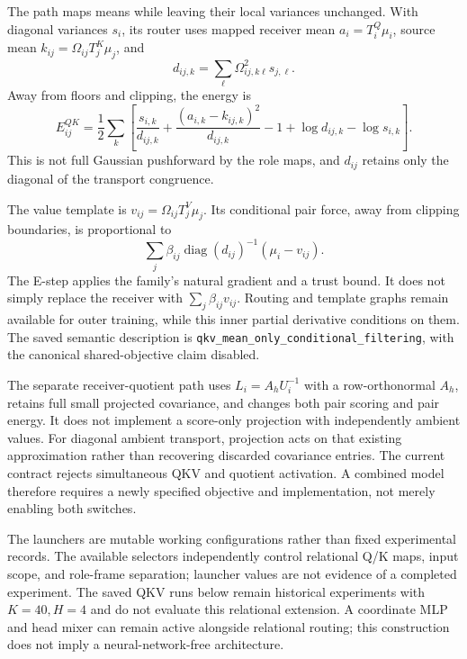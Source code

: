 \documentclass[11pt,letterpaper]{article}
\newcommand{\diag}{\operatorname{diag}}
\theoremstyle{remark}
\begin{document}
The path maps means while leaving their local variances unchanged. With diagonal variances $s_i$, its router uses mapped receiver mean $a_i=T_i^Q\mu_i$, source mean $k_{ij}=\Omega_{ij}T_j^K\mu_j$, and
\begin{equation}
 d_{ij,k}=\sum_\ell\Omega_{ij,k\ell}^2s_{j,\ell}.
\end{equation}
Away from floors and clipping, the energy is
\begin{equation}
 E_{ij}^{QK}=\frac12\sum_k\left[
 \frac{s_{i,k}}{d_{ij,k}}
 +\frac{(a_{i,k}-k_{ij,k})^2}{d_{ij,k}}
 -1+\log d_{ij,k}-\log s_{i,k}\right].
\end{equation}
This is not full Gaussian pushforward by the role maps, and $d_{ij}$ retains only the diagonal of the transport congruence.

The value template is $v_{ij}=\Omega_{ij}T_j^V\mu_j$. Its conditional pair force, away from clipping boundaries, is proportional to
\begin{equation}
 \sum_j\beta_{ij}\diag(d_{ij})^{-1}(\mu_i-v_{ij}).
\end{equation}
The E-step applies the family's natural gradient and a trust bound. It does not simply replace the receiver with $\sum_j\beta_{ij}v_{ij}$. Routing and template graphs remain available for outer training, while this inner partial derivative conditions on them. The saved semantic description is \texttt{qkv\_mean\_only\_conditional\_filtering}, with the canonical shared-objective claim disabled.

The separate receiver-quotient path uses $L_i=A_hU_i^{-1}$ with a row-orthonormal $A_h$, retains full small projected covariance, and changes both pair scoring and pair energy. It does not implement a score-only projection with independently ambient values. For diagonal ambient transport, projection acts on that existing approximation rather than recovering discarded covariance entries. The current contract rejects simultaneous QKV and quotient activation. A combined model therefore requires a newly specified objective and implementation, not merely enabling both switches.

The launchers are mutable working configurations rather than fixed experimental records. The available selectors independently control relational Q/K maps, input scope, and role-frame separation; launcher values are not evidence of a completed experiment. The saved QKV runs below remain historical experiments with $K=40,H=4$ and do not evaluate this relational extension. A coordinate MLP and head mixer can remain active alongside relational routing; this construction does not imply a neural-network-free architecture.
\end{document}
